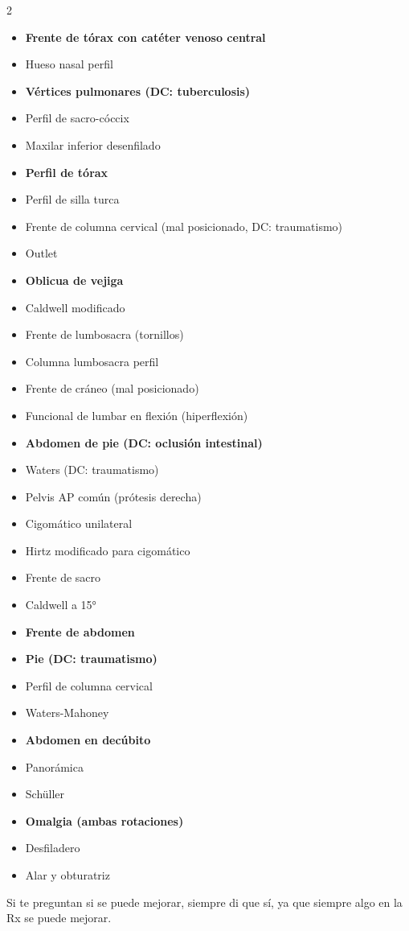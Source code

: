 	\begin{multicols}{2}
		\begin{itemize}
			\item \textbf{Frente de tórax con catéter venoso central}
			\item Hueso nasal perfil
			\item \textbf{Vértices pulmonares (DC: tuberculosis)}
			\item Perfil de sacro-cóccix
			\item Maxilar inferior desenfilado
			\item \textbf{Perfil de tórax}
			\item Perfil de silla turca
			\item Frente de columna cervical (mal posicionado, DC: traumatismo)
			\item Outlet
			\item \textbf{Oblicua de vejiga}
			\item Caldwell modificado
			\item Frente de lumbosacra (tornillos)
			\item Columna lumbosacra perfil
			\item Frente de cráneo (mal posicionado)
			\item Funcional de lumbar en flexión (hiperflexión)
			\item \textbf{Abdomen de pie (DC: oclusión intestinal)}
			\item Waters (DC: traumatismo)
			\item Pelvis AP común (prótesis derecha)
			\item Cigomático unilateral
			\item Hirtz modificado para cigomático
			\item Frente de sacro
			\item Caldwell a 15°
			\item \textbf{Frente de abdomen}
			\item \textbf{Pie (DC: traumatismo)}
			\item Perfil de columna cervical
			\item Waters-Mahoney
			\item \textbf{Abdomen en decúbito}
			\item Panorámica
			\item Schüller
			\item \textbf{Omalgia (ambas rotaciones)}
			\item Desfiladero
			\item Alar y obturatriz
		\end{itemize}
	\end{multicols}
	
	\begin{tcolorbox}[colback=red!10, colframe=red, title=Importante]
		Si te preguntan si se puede mejorar, siempre di que sí, ya que siempre algo en la
		Rx se puede mejorar.
	\end{tcolorbox}